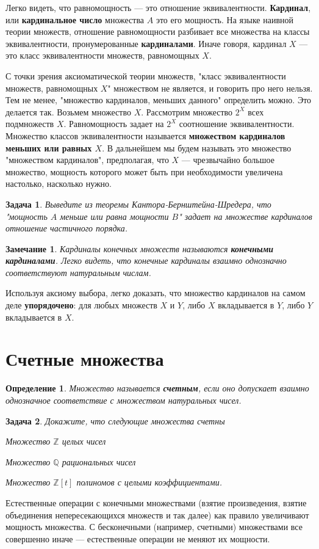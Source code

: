 \documentclass[12pt]{book}
\def\Z{{\mathbb Z}}
\def\Q{{\mathbb Q}}
\theoremstyle{upshape}
\newtheorem{zadacha}{Задача}[chapter]
\theoremstyle{generic}
\newtheorem{opredelenie}[teorema]{Определение}
\newtheorem{remark}[teorema]{Замечание}
\def\замечание{\begin{remark}}
\def\еза{\end{remark}}
\theoremstyle{upshapenonumber}
\newcommand{\следствие}{%
     \refstepcounter{teorema}
     {\noindent\bf Следствие \thechapter.\arabic{teorema}:\ }}
\newcommand{\пример}{%
     \refstepcounter{teorema}
     {\noindent\bf Пример \thechapter.\arabic{teorema}:\ }}
\newcommand{\лемма}{%
     \refstepcounter{teorema}
     {\noindent\bf Лемма \thechapter.\arabic{teorema}:\ }}
\newcommand{\теорема}{%
     \refstepcounter{teorema}
     {\noindent\bf Теорема \thechapter.\arabic{teorema}:\ }}
\newcommand{\утверждение}{%
     \refstepcounter{teorema}
     {\noindent\bf Утверждение \thechapter.\arabic{teorema}:\ }}
\def\бф{\bf}
\def\ем{\em}
\def\ит{\it}
\def\задача{\begin{zadacha}}
\def\ез{\end{zadacha}}
\def\еу{\end{ukazanie}}
\def\определение{\begin{opredelenie}}
\def\ео{\end{opredelenie}}
\def\енум{\begin{enumerate}}
\def\ее{\end{enumerate}}
\def\итем{\item %
}
\begin{document}
Легко видеть, что равномощность --- это отношение
эквивалентности. {\бф Кардинал}, или
{\бф кардинальное число} множества $A$ это
его мощность. На языке наивной теории множеств,
отношение равномощности разбивает все множества
на классы эквивалентности, пронумерованные 
{\бф кардиналами}. Иначе говоря, кардинал
$X$ --- это класс эквивалентности множеств, 
равномощных $X$.

С точки зрения аксиоматической теории
множеств, "класс эквивалентности множеств, 
равномощных $X$" множеством не является,
и говорить про него нельзя. Тем не менее,
"множество кардиналов, меньших данного"
определить можно. Это делается так.
Возьмем множество $X$. Рассмотрим
множество $2^X$ всех подмножеств $X$.
Равномощность задает на $2^X$
соотношение эквивалентности.
Множество классов эквивалентности
называется {\бф множеством кардиналов
меньших или равных $X$}. В дальнейшем
мы будем называть это множество 
"множеством кардиналов", предполагая,
что $X$ --- чрезвычайно большое множество,
мощность которого может быть при необходимости
увеличена настолько, насколько нужно.

\задача Выведите
из теоремы Кантора-Бернштейна-Шредера,
что "мощность $A$ меньше или равна
мощности $B$" задает на множестве
кардиналов отношение частичного порядка.
\ез

\замечание Кардиналы конечных
множеств называются {\бф конечными кардиналами}.
Легко видеть, что конечные кардиналы
взаимно однозначно соответствуют натуральным
числам. 
\еза

Используя аксиому выбора, легко доказать,
что множество кардиналов на самом деле
{\бф упорядочено}: для любых
множеств $X$ и $Y$, либо
$X$ вкладывается в $Y$, либо $Y$
вкладывается в $X$. 


\section{Счетные множества}

\определение
Множество называется {\бф счетным}, если
оно допускает взаимно однозначное соответствие
с множеством натуральных чисел.
\ео


\задача
Докажите, что следующие множества счетны
\итем Множество $\Z$ целых чисел
\итем Множество $\Q$ рациональных чисел
\итем Множество $\Z[t]$ полиномов с целыми коэффициентами.
\ез

Естественные операции с конечными множествами
(взятие произведения, взятие объединения
непересекающихся множеств и так далее)
как правило увеличивают мощность множества.
С бесконечными (например, счетными) множествами
все совершенно иначе --- естественные операции
не меняют их мощности.
\end{document}
